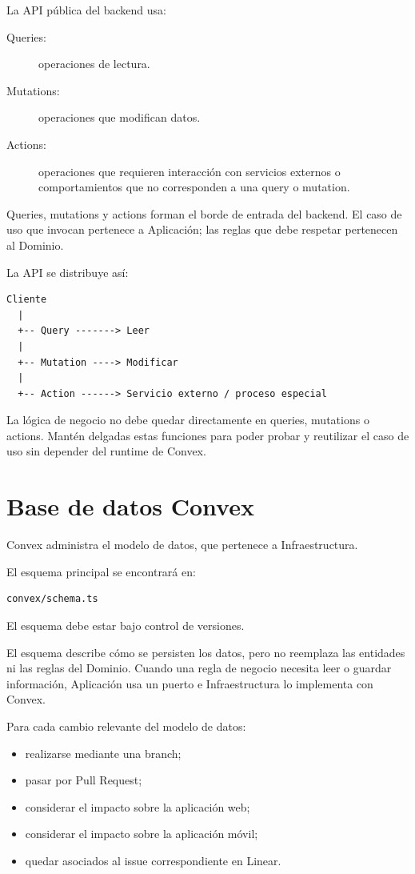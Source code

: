\documentclass[11pt,a4paper]{article}
\begin{document}
La API pública del backend usa:

\begin{description}
  \item[Queries:] operaciones de lectura.
  \item[Mutations:] operaciones que modifican datos.
  \item[Actions:] operaciones que requieren interacción con servicios externos
    o comportamientos que no corresponden a una query o mutation.
\end{description}

Queries, mutations y actions forman el borde de entrada del backend. El caso de
uso que invocan pertenece a Aplicación; las reglas que debe respetar pertenecen
al Dominio.

La API se distribuye así:

\begin{lstlisting}
Cliente
  |
  +-- Query -------> Leer
  |
  +-- Mutation ----> Modificar
  |
  +-- Action ------> Servicio externo / proceso especial
\end{lstlisting}

La lógica de negocio no debe quedar directamente en queries, mutations o
actions. Mantén delgadas estas funciones para poder probar y reutilizar el caso
de uso sin depender del runtime de Convex.

\section{Base de datos Convex}

Convex administra el modelo de datos, que pertenece a Infraestructura.

El esquema principal se encontrará en:

\begin{lstlisting}
convex/schema.ts
\end{lstlisting}

El esquema debe estar bajo control de versiones.

El esquema describe cómo se persisten los datos, pero no reemplaza las
entidades ni las reglas del Dominio. Cuando una regla de negocio necesita leer o
guardar información, Aplicación usa un puerto e Infraestructura lo implementa
con Convex.

Para cada cambio relevante del modelo de datos:

\begin{itemize}
  \item realizarse mediante una branch;
  \item pasar por Pull Request;
  \item considerar el impacto sobre la aplicación web;
  \item considerar el impacto sobre la aplicación móvil;
  \item quedar asociados al issue correspondiente en Linear.
\end{itemize}
\end{document}

